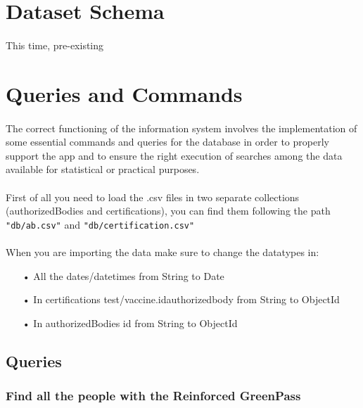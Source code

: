 \documentclass[a4paper,12pt]{article}
\begin{document}
\section{Dataset Schema}
\paragraph{} This time, pre-existing 
\section{Queries and Commands}
\paragraph{} The correct functioning of the information system involves the implementation of some essential commands and queries for the database in order to properly support the app and to ensure the right execution of searches among the data available for statistical or practical purposes. \par
\paragraph{} First of all you need to load the .csv files in two separate collections (authorizedBodies and certifications), you can find them following the path \texttt{"db/ab.csv"} and \texttt{"db/certification.csv"}
\paragraph{}When you are importing the data make sure to change the datatypes in:
\begin{itemize}
\item[•] All the dates/datetimes from String to Date
\item[•] In certifications test/vaccine.id\textunderscore authorized\textunderscore body from String to ObjectId
\item[•] In authorizedBodies \textunderscore id from String to ObjectId
\end{itemize}
\subsection{Queries}
\subsubsection{Find all the people with the Reinforced GreenPass}
\end{document}

